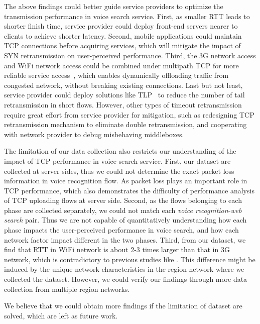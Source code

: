 The above findings could better guide service providers to optimize the transmission performance in voice search service. First, as smaller RTT leads to shorter finish time, service provider could deploy front-end servers nearer to clients to achieve shorter latency. Second, mobile applications could maintain TCP connections before acquiring services, which will mitigate the impact of SYN retransmission on user-perceived performance. Third, the 3G network access and WiFi network access could be combined under multipath TCP for more reliable service access~\cite{UM-CS-2012-022}, which enables dynamically offloading traffic from congested network, without breaking existing connections. Last but not least, service provider could deploy solutions like TLP~\cite{flach2013reducing} to reduce the number of tail retransmission in short flows. However, other types of timeout retransmission require great effort from service provider for mitigation, such as redesigning TCP retransmission mechanism to eliminate double retransmission, and cooperating with network provider to debug misbehaving middleboxes.

The limitation of our data collection also restricts our understanding of the impact of TCP performance in voice search service. First, our dataset are collected at server sides, thus we could not determine the exact packet loss information in voice recognition flow. As packet loss plays an important role in TCP performance, which also demonstrates the difficulty of performance analysis of TCP uploading flows at server side. Second, as the flows belonging to each phase are collected separately, we could not match each \emph{voice recognition}-\emph{web search} pair. Thus we are not capable of quantitatively understanding how each phase impacts the user-perceived performance in voice search, and how each network factor impact different in the two phases. Third, from our dataset, we find that RTT in WiFi network is about 2-3 times larger than that in 3G network, which is contradictory to previous studies like \cite{sommers2012cell}. This difference might be induced by the unique network characteristics in the region network where we collected the dataset. However, we could verify our findings through more data collection from multiple region networks.

We believe that we could obtain more findings if the limitation of dataset are solved, which are left as future work.